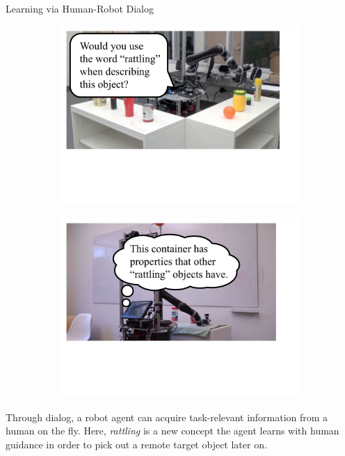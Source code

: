 \documentclass[final]{beamer}
\newcommand{\setblocksize}{\Large \centering}
\newcommand{\paragraphbreak}{\vspace{1cm}}
\begin{document}
\begin{frame}{}
\begin{columns}[t]
\begin{column}{.24\linewidth}
\begin{block}{\setblocksize Learning via Human-Robot Dialog}
{\begin{figure}
\centering
  \begin{subfigure}{0.9\textwidth}
    \centering
    \includegraphics[width=\linewidth]{figures/rattling_ask.pdf}
    \vspace{-5.5cm}
  \end{subfigure}
  \begin{subfigure}{0.92\textwidth}
    \centering
    \includegraphics[width=\linewidth]{figures/rattling_think.pdf}
    \vspace{-5.5cm}
  \end{subfigure}
\end{figure}
Through dialog, a robot agent can acquire task-relevant information from a human on the fly.
Here, \emph{rattling} is a new concept the agent learns with human guidance in order to pick out a remote target object later on.
\paragraphbreak

}
\end{block}
\end{column}
\end{columns}
\end{frame}
\end{document}
